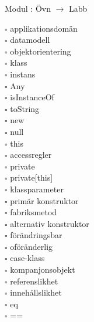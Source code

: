 
    Modul : Övn  $\rightarrow$ Labb \Alert{\texttt{--}}
    \begin{multicols}{3}\SlideFontTiny
    $\square$ applikationsdomän \\
$\square$ datamodell \\
$\square$ objektorientering \\
$\square$ klass \\
$\square$ instans \\
$\square$ Any \\
$\square$ isInstanceOf \\
$\square$ toString \\
$\square$ new \\
$\square$ null \\
$\square$ this \\
$\square$ accessregler \\
$\square$ private \\
$\square$ private[this] \\
$\square$ klassparameter \\
$\square$ primär konstruktor \\
$\square$ fabriksmetod \\
$\square$ alternativ konstruktor \\
$\square$ förändringsbar \\
$\square$ oföränderlig \\
$\square$ case-klass \\
$\square$ kompanjonsobjekt \\
$\square$ referenslikhet \\
$\square$ innehållslikhet \\
$\square$ eq \\
$\square$ == \\
    \end{multicols}
    